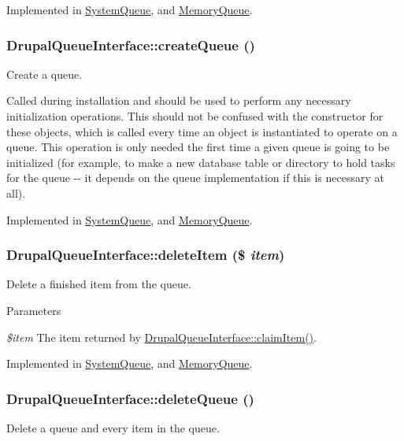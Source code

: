 Implemented in \hyperlink{classSystemQueue_abf9ce9dc71e435f3fc0471e2187730a3}{SystemQueue}, and \hyperlink{classMemoryQueue_a5d8fe8085407a1a77c505ba8532b9c50}{MemoryQueue}.\hypertarget{interfaceDrupalQueueInterface_a5a657d8c1d5bb429b3e594fa0c883ad3}{
\subsubsection[{createQueue}]{\setlength{\rightskip}{0pt plus 5cm}DrupalQueueInterface::createQueue ()}}
\label{interfaceDrupalQueueInterface_a5a657d8c1d5bb429b3e594fa0c883ad3}
Create a queue.

Called during installation and should be used to perform any necessary initialization operations. This should not be confused with the constructor for these objects, which is called every time an object is instantiated to operate on a queue. This operation is only needed the first time a given queue is going to be initialized (for example, to make a new database table or directory to hold tasks for the queue -\/-\/ it depends on the queue implementation if this is necessary at all). 

Implemented in \hyperlink{classSystemQueue_a92bade740b59032aced46cfcbfaaeed6}{SystemQueue}, and \hyperlink{classMemoryQueue_a94e1da7e8b4cccb445acb8500e0b39a5}{MemoryQueue}.\hypertarget{interfaceDrupalQueueInterface_aa61212089c1bcc410e8f87f8e619e351}{
\subsubsection[{deleteItem}]{\setlength{\rightskip}{0pt plus 5cm}DrupalQueueInterface::deleteItem (\$ {\em item})}}
\label{interfaceDrupalQueueInterface_aa61212089c1bcc410e8f87f8e619e351}
Delete a finished item from the queue.


\begin{DoxyParams}{Parameters}
\item[{\em \$item}]The item returned by \hyperlink{interfaceDrupalQueueInterface_a2f0f2ccc1f4d55c0890897ea85e75954}{DrupalQueueInterface::claimItem()}. \end{DoxyParams}


Implemented in \hyperlink{classSystemQueue_a868c037c23889db59acfeadc5d30c6f9}{SystemQueue}, and \hyperlink{classMemoryQueue_a3091327204bb8b2e9c13baf32142f7f5}{MemoryQueue}.\hypertarget{interfaceDrupalQueueInterface_ad403fed96dbd86e64a8a48c33fe5f2bc}{
\subsubsection[{deleteQueue}]{\setlength{\rightskip}{0pt plus 5cm}DrupalQueueInterface::deleteQueue ()}}
\label{interfaceDrupalQueueInterface_ad403fed96dbd86e64a8a48c33fe5f2bc}
Delete a queue and every item in the queue. 

